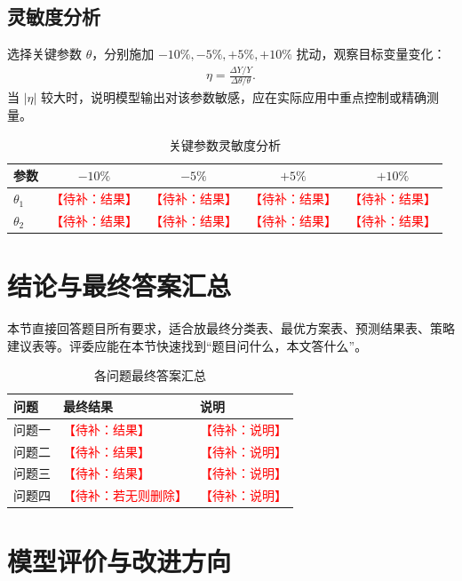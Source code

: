\documentclass[UTF8,a4paper,zihao=5]{ctexart}
\numberwithin{equation}{section}
\numberwithin{figure}{section}
\numberwithin{table}{section}
\newcommand{\todo}[1]{\textcolor{red}{【待补：#1】}}
\begin{document}
\subsection{灵敏度分析}
选择关键参数 $\theta$，分别施加 $-10\%,-5\%,+5\%,+10\%$ 扰动，观察目标变量变化：
\begin{align}
  \eta = \frac{\Delta Y / Y}{\Delta \theta / \theta} .
\end{align}
当 $|\eta|$ 较大时，说明模型输出对该参数敏感，应在实际应用中重点控制或精确测量。

\begin{table}[H]
  \centering
  \caption{关键参数灵敏度分析}
  \begin{tabular}{lcccc}
    \toprule
    参数 & $-10\%$ & $-5\%$ & $+5\%$ & $+10\%$ \\
    \midrule
    $\theta_1$ & \todo{结果} & \todo{结果} & \todo{结果} & \todo{结果} \\
    $\theta_2$ & \todo{结果} & \todo{结果} & \todo{结果} & \todo{结果} \\
    \bottomrule
  \end{tabular}
\end{table}

\section{结论与最终答案汇总}

本节直接回答题目所有要求，适合放最终分类表、最优方案表、预测结果表、策略建议表等。评委应能在本节快速找到“题目问什么，本文答什么”。

\begin{table}[H]
  \centering
  \caption{各问题最终答案汇总}
  \begin{tabularx}{\linewidth}{lXX}
    \toprule
    问题 & 最终结果 & 说明 \\
    \midrule
    问题一 & \todo{结果} & \todo{说明} \\
    问题二 & \todo{结果} & \todo{说明} \\
    问题三 & \todo{结果} & \todo{说明} \\
    问题四 & \todo{若无则删除} & \todo{说明} \\
    \bottomrule
  \end{tabularx}
\end{table}

\section{模型评价与改进方向}
\end{document}
